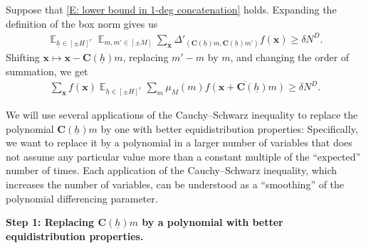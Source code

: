 \documentclass[11pt]{amsart}
\theoremstyle{definition}
\DeclareMathOperator*{\E}{\mathbb{E}}
\newcommand{\bc}{{\mathbf{C}}}
\newcommand{\bx}{{\mathbf{x}}}
\newcommand{\uh}{{\underline{h}}}
\begin{document}
Suppose that \eqref{E: lower bound in 1-deg concatenation} holds. Expanding the definition of the box norm gives us
\begin{align*}
    \E_{\uh\in[\pm H]^r}\E_{m, m'\in[\pm M]}\sum_{\bx} \Delta'_{(\bc(\uh) m, \bc(\uh) m')}f(\bx)\geq \delta N^D.
\end{align*}
Shifting $\bx \mapsto \bx-\bc(\uh)m$, replacing $m'-m$ by $m$, and changing the order of summation, we get
\begin{align*}
    \sum_\bx f(\bx) \E_{\uh\in[\pm H]^r}\sum_{m}\mu_M(m) \overline{f(\bx + \bc(\uh) m)}\geq \delta N^D.
\end{align*}

We will use several applications of the Cauchy--Schwarz inequality to replace the polynomial $\bc(\uh)m$ by one with better equidistribution properties: Specifically, we want to replace it by a polynomial in a larger number of variables that does not assume any particular value more than a constant multiple of the ``expected'' number of times. Each application of the Cauchy--Schwarz inequality, which increases the number of variables, can be understood as a ``smoothing'' of the polynomial differencing parameter.

\smallskip
\textbf{Step 1: Replacing $\bc(\uh)m$ by a polynomial with better equidistribution properties.}
\smallskip
\end{document}
